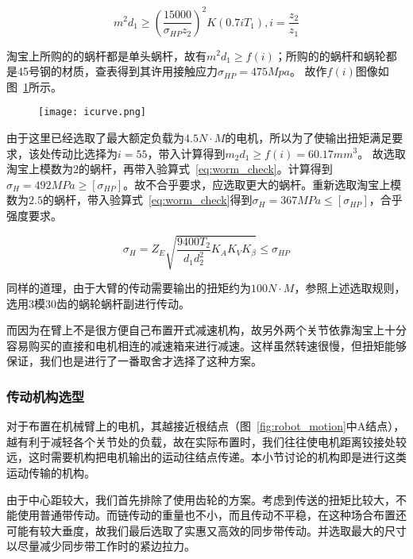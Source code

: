 \begin{equation}
    \label{eq:worm_design}
    m^2d_1\geq(\frac{15000}{\sigma_{HP}z_2})^2K(0.7iT_1),i=\frac{z_2}{z_1}
\end{equation}

淘宝上所购的的蜗杆都是单头蜗杆，故有$m^2d_1 \geq f(i)$；所购的的蜗杆和蜗轮都是45号钢的材质，查表得到其许用接触应力$\sigma_{HP} = 475 Mpa$。
故作$f(i)$图像如图~\ref{fig:icurve}所示。

\begin{figure}
    \centering
    \texttt{[image: icurve.png]}
    \label{fig:icurve}
\end{figure}

由于这里已经选取了最大额定负载为$4.5 N\cdot M$的电机，所以为了使输出扭矩满足要求，该处传动比选择为$i = 55$，带入计算得到$m_2d_1\geq f(i) = 60.17 mm^3$。
故选取淘宝上模数为$2$的蜗杆，再带入验算式~\ref{eq:worm_check}。计算得到$\sigma_H = 492 MPa \geq [\sigma_{HP}]$。故不合乎要求，应选取更大的蜗杆。重新选取淘宝上模数为$2.5$的蜗杆，带入验算式~\ref{eq:worm_check}得到$\sigma_H = 367 MPa \leq [\sigma_{HP}]$，合乎强度要求。

\begin{equation}
    \label{eq:worm_check}
    \sigma_H = Z_E \sqrt{\frac{9400 T_2}{d_1 d_2^2}K_A K_V K_\beta} \leq \sigma_{HP}
\end{equation}

同样的道理，由于大臂的传动需要输出的扭矩约为$100 N \cdot M$，参照上述选取规则，选用3模30齿的蜗轮蜗杆副进行传动。

而因为在臂上不是很方便自己布置开式减速机构，故另外两个关节依靠淘宝上十分容易购买的直接和电机相连的减速箱来进行减速。这样虽然转速很慢，但扭矩能够保证，我们也是进行了一番取舍才选择了这种方案。

\subsubsection{传动机构选型}

对于布置在机械臂上的电机，其越接近根结点（图~\ref{fig:robot_motion}中A结点），越有利于减轻各个关节处的负载，故在实际布置时，我们往往使电机距离铰接处较远，这时需要机构把电机输出的运动往结点传递。本小节讨论的机构即是进行这类运动传输的机构。

由于中心距较大，我们首先排除了使用齿轮的方案。考虑到传送的扭矩比较大，不能使用普通带传动。而链传动的重量也不小，而且传动不平稳，在这种场合布置还可能有较大垂度，故我们最后选取了实惠又高效的同步带传动。并选取最大的尺寸以尽量减少同步带工作时的紧边拉力。